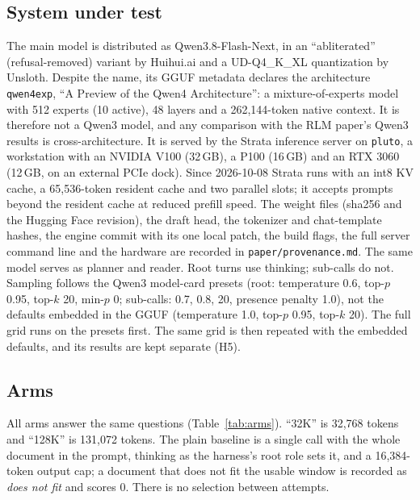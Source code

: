 \documentclass[11pt]{article}
\newcommand{\code}[1]{\texttt{#1}}
\begin{document}
\subsection{System under test}
The main model is distributed as Qwen3.8-Flash-Next, in an ``abliterated''
(refusal-removed) variant by Huihui.ai and a UD-Q4\_K\_XL quantization by Unsloth.
Despite the name, its GGUF metadata declares the architecture \code{qwen4exp}, ``A
Preview of the Qwen4 Architecture'': a mixture-of-experts model with 512 experts (10
active), 48 layers and a 262,144-token native context. It is therefore not a Qwen3
model, and any comparison with the RLM paper's Qwen3 results is cross-architecture.
It is served by the Strata inference server on \code{pluto},
a workstation with an NVIDIA V100 (32\,GB), a P100 (16\,GB) and an RTX 3060
(12\,GB, on an external PCIe dock). Since 2026-10-08 Strata runs with an int8 KV
cache, a 65,536-token resident cache and two parallel slots; it accepts prompts
beyond the resident cache at reduced prefill speed. The weight files (sha256 and the
Hugging Face revision), the draft head, the tokenizer and chat-template hashes, the
engine commit with its one local patch, the build flags, the full server command line
and the hardware are recorded in \code{paper/provenance.md}. The same model serves as
planner and reader. Root turns use thinking; sub-calls do not. Sampling follows the
Qwen3 model-card presets (root: temperature 0.6, top-$p$ 0.95, top-$k$ 20, min-$p$ 0;
sub-calls: 0.7, 0.8, 20, presence penalty 1.0), not the defaults embedded in the GGUF
(temperature 1.0, top-$p$ 0.95, top-$k$ 20). The full grid runs on the presets first.
The same grid is then repeated with the embedded defaults, and its results are kept
separate (H5).

\subsection{Arms}
All arms answer the same questions (Table~\ref{tab:arms}). ``32K'' is 32,768
tokens and ``128K'' is 131,072 tokens. The plain baseline is a single call with the
whole document in the prompt, thinking as the harness's root role sets it, and a
16,384-token output cap; a document that does not fit the usable window is recorded
as \emph{does not fit} and scores 0. There is no selection between attempts.
\end{document}
